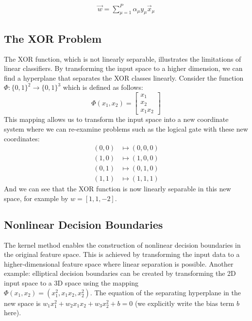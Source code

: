 \documentclass[11pt]{book} %
\begin{document}
\begin{align*}
    \vec{w} = \sum_{\mu=1}^P \alpha_{\mu} y_{\mu} \vec{x}_{\mu}
\end{align*}

\subsection{The XOR Problem}
The XOR function, which is not linearly separable, illustrates the limitations of linear classifiers. 
By transforming the input space to a higher dimension, we can find a hyperplane that separates the XOR classes linearly.
Consider the function $\Phi: \{0,1\}^2 \rightarrow \{0,1\}^3$ which is defined as follows:
\begin{equation*}
    \Phi(x_1, x_2) = \begin{bmatrix}
        x_1 \\
        x_2 \\
        x_1 x_2
    \end{bmatrix}
\end{equation*}
This mapping allows us to transform the input space into a new coordinate system where we can re-examine problems such as the logical gate with these new coordinates:
\begin{align*}
    (0, 0) &\mapsto (0, 0, 0) \\
    (1, 0) &\mapsto (1, 0, 0) \\
    (0, 1) &\mapsto (0, 1, 0) \\
    (1, 1) &\mapsto (1, 1, 1)
\end{align*}
And we can see that the XOR function is now linearly separable in this new space, for example by $w = [1, 1, -2]$.


\subsection{Nonlinear Decision Boundaries}
The kernel method enables the construction of nonlinear decision boundaries in the original feature space. 
This is achieved by transforming the input data to a higher-dimensional feature space where linear separation is possible.
Another example: elliptical decision boundaries can be created by transforming the 2D input space to a 3D space using the mapping \\
$\Phi(x_1, x_2) = (x_1^2, x_1 x_2, x_2^2)$.
The equation of the separating hyperplane in the new space is $w_1 x_1^2 + w_2 x_1 x_2 + w_3 x_2^2 + b = 0$ (we explicitly write the bias term $b$ here).
\end{document}
